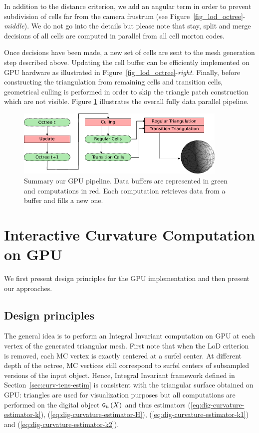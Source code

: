 \documentclass{llncs}
\begin{document}
%
In addition to the distance criterion, we add an angular term in order
to prevent subdivision of cells far from the camera frustrum (see
Figure~\ref{fig_lod_octree}-\emph{middle}). We do not go into the
details but please note that stay, split and merge decisions of all cells are computed in
parallel from all cell morton codes.

Once decisions have been made, a new set of cells are sent to the mesh
generation step described above. Updating the cell buffer can be
efficiently implemented on GPU hardware as illustrated in
Figure~\ref{fig_lod_octree}-\emph{right}.  Finally, before
constructing the triangulation from remaining cells and transition
cells, geometrical culling is performed in order to skip the triangle
patch construction which are not visible. Figure \ref{fig_pipeline}
illustrates the overall fully data parallel pipeline.

\begin{figure}[!htbp]
  \centering
  \includegraphics[width=0.9\textwidth]{figs/pipeline}
  \caption{ Summary our GPU pipeline. Data buffers are
    represented in green and computations in red. Each computation
    retrieves data from a buffer and fills a new one. }
  \label{fig_pipeline}
\end{figure}




\section{Interactive Curvature Computation on GPU}
\label{sec:inter-visu-gpu}

We first present design principles for the GPU implementation and then
present our approaches.

\subsection{Design principles}

The general idea is to perform an Integral Invariant computation on
GPU at each vertex of the generated triangular mesh. First note that
when the LoD criterion is removed, each MC vertex is exactly centered at
a surfel center. At different depth of the octree, MC vertices still
correspond to surfel centers of subsampled versions of the input
object. Hence, Integral Invariant framework defined in
Section~\ref{sec:curv-tens-estim} is consistent with the triangular
surface obtained on GPU: triangles are used for visualization purposes
but all computations are performed on the digital object $\mathtt{G}_{h}\left(X\right)$ and thus
estimators
(\ref{eq:dig-curvature-estimator-k}),
(\ref{eq:dig-curvature-estimator-H}), (\ref{eq:dig-curvature-estimator-k1})
and (\ref{eq:dig-curvature-estimator-k2}).
\end{document}

